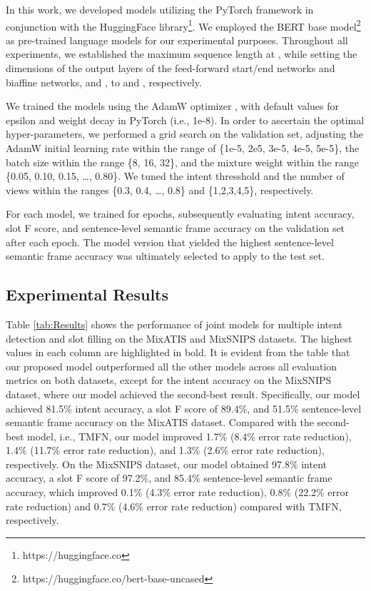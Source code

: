 \documentclass{ecai}
\begin{document}
In this work, we developed models utilizing the PyTorch framework in conjunction with the HuggingFace library\footnote{https://huggingface.co}. We employed the BERT base model\footnote{https://huggingface.co/bert-base-uncased} as pre-trained language models for our experimental purposes. Throughout all experiments, we established the maximum sequence length at , while setting the dimensions of the output layers of the feed-forward start/end networks and biaffine networks,  and , to  and , respectively.

We trained the models using the AdamW optimizer \cite{Loshchilov:2019}, with default values for epsilon and weight decay in PyTorch (i.e., 1e-8). In order to ascertain the optimal hyper-parameters, we performed a grid search on the validation set, adjusting the AdamW initial learning rate within the range of \{1e-5, 2e5, 3e-5, 4e-5, 5e-5\}, the batch size within the range \{8, 16, 32\}, and the mixture weight  within the range \{0.05, 0.10, 0.15, \ldots, 0.80\}.  We tuned the intent thresshold  and the number of views  within the ranges \{0.3, 0.4, \ldots , 0.8\} and \{1,2,3,4,5\}, respectively.

For each model, we trained for  epochs, subsequently evaluating intent accuracy, slot F score, and sentence-level semantic frame accuracy on the validation set after each epoch. The model version that yielded the highest sentence-level semantic frame accuracy was ultimately selected to apply to the test set. 

\subsection{Experimental Results}
Table \ref{tab:Results} shows the performance of joint models for multiple intent detection and slot filling on the MixATIS and MixSNIPS datasets. The highest values in each column are highlighted in bold. It is evident from the table that our proposed model outperformed all the other models across all evaluation metrics on both datasets, except for the intent accuracy on the MixSNIPS dataset, where our model achieved the second-best result. Specifically, our model achieved 81.5\% intent accuracy, a slot F score of 89.4\%, and 51.5\% sentence-level semantic frame accuracy on the MixATIS dataset. Compared with the second-best model, i.e., TMFN, our model improved 1.7\% (8.4\% error rate reduction), 1.4\% (11.7\% error rate reduction), and 1.3\% (2.6\% error rate reduction), respectively. On the MixSNIPS dataset, our model obtained 97.8\% intent accuracy, a slot F score of 97.2\%, and 85.4\% sentence-level semantic frame accuracy, which improved 0.1\% (4.3\% error rate reduction), 0.8\% (22.2\% error rate reduction) and 0.7\% (4.6\% error rate reduction) compared with TMFN, respectively.
\end{document}
